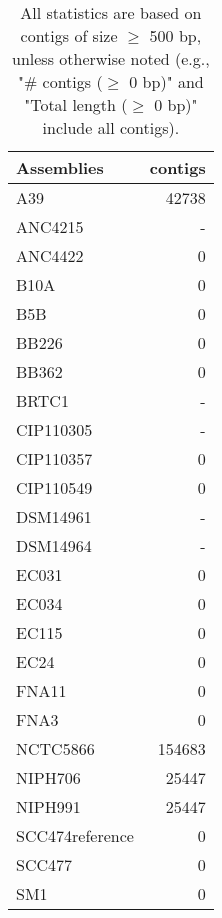 \documentclass[12pt,a4paper]{article}
\begin{document}
\begin{table}[ht]
\begin{center}
\caption{All statistics are based on contigs of size $\geq$ 500 bp, unless otherwise noted (e.g., "\# contigs ($\geq$ 0 bp)" and "Total length ($\geq$ 0 bp)" include all contigs).}
\begin{tabular}{|l*{1}{|r}|}
\hline
Assemblies & contigs \\ \hline
A39 & 42738 \\ \hline
ANC4215 & - \\ \hline
ANC4422 & 0 \\ \hline
B10A & 0 \\ \hline
B5B & 0 \\ \hline
BB226 & 0 \\ \hline
BB362 & 0 \\ \hline
BRTC1 & - \\ \hline
CIP110305 & - \\ \hline
CIP110357 & 0 \\ \hline
CIP110549 & 0 \\ \hline
DSM14961 & - \\ \hline
DSM14964 & - \\ \hline
EC031 & 0 \\ \hline
EC034 & 0 \\ \hline
EC115 & 0 \\ \hline
EC24 & 0 \\ \hline
FNA11 & 0 \\ \hline
FNA3 & 0 \\ \hline
NCTC5866 & 154683 \\ \hline
NIPH706 & 25447 \\ \hline
NIPH991 & 25447 \\ \hline
SCC474reference & 0 \\ \hline
SCC477 & 0 \\ \hline
SM1 & 0 \\ \hline
\end{tabular}
\end{center}
\end{table}
\end{document}
